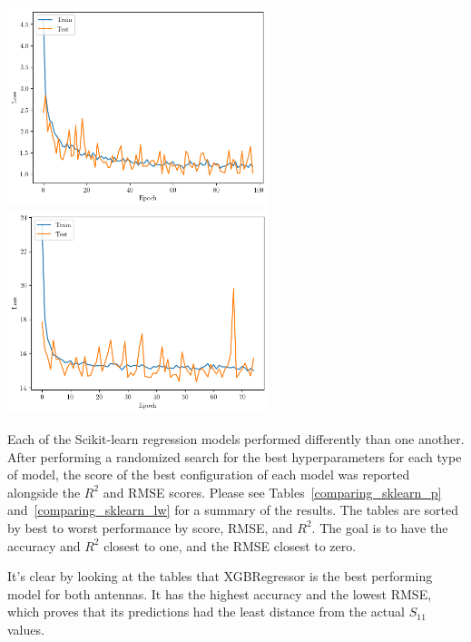 \documentclass[conference]{IEEEtran}
\newenvironment{Figure}
    {\par\medskip\noindent\minipage{\linewidth}}
    {\endminipage\par\medskip}
\begin{document}
\begin{Figure}
    \centering
    \includegraphics[width=3in]{loss}
    \includegraphics[width=3in]{loss_lw}
    \label{dnn_loss_graph}
\end{Figure}

Each of the Scikit-learn regression models performed differently than one another. After performing a randomized search for the best hyperparameters for each type of model, the score of the best configuration of each model was reported alongside the $R^2$ and RMSE scores. Please see Tables~\ref{comparing_sklearn_p} and~\ref{comparing_sklearn_lw} for a summary of the results. The tables are sorted by best to worst performance by score, RMSE, and $R^2$. The goal is to have the accuracy and $R^2$ closest to one, and the RMSE closest to zero. 

It's clear by looking at the tables that XGBRegressor is the best performing model for both antennas. It has the highest accuracy and the lowest RMSE, which proves that its predictions had the least distance from the actual $S_{11}$ values. 
\end{document}

